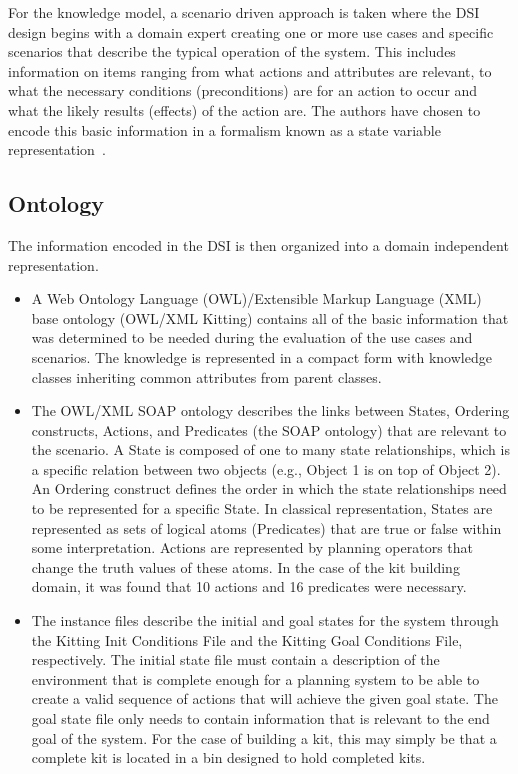 For the knowledge model, a scenario driven approach is taken where the DSI design begins with a domain expert creating one or more use cases and specific scenarios that describe the typical operation of the system. This includes information on items ranging from what actions and attributes are relevant, to what the necessary conditions (preconditions) are for an action to occur and what the likely results (effects) of the action are. The authors have chosen to encode this basic information in a formalism known as a state variable representation~\cite{NAU.2004}.


\subsection{Ontology}
\label{subsection:ontology}
The information encoded in the DSI is then organized into a domain
independent representation.

\begin{itemize}
\item A Web Ontology Language (OWL)/Extensible Markup Language (XML) base ontology (\textsf{OWL/XML Kitting})
contains all of the basic information that was determined to be needed
during the evaluation of the use cases and scenarios. The knowledge is
represented in a compact form with knowledge classes
inheriting common attributes from parent classes.
\item The \textsf{OWL/XML SOAP} ontology describes the links between States, Ordering constructs, Actions, and Predicates (the SOAP
ontology) that are relevant to the scenario. A State is composed of one to many state relationships, which is
a specific relation between two objects (e.g., Object 1 is on top of Object 2). An Ordering construct defines the order in which the state relationships need to be
represented for a specific State. In classical representation, States are represented as sets of logical
atoms (Predicates) that are true or false within some interpretation. Actions are represented by
planning operators that change the truth values of these atoms. In the case of the kit building domain, it was found that 10 actions and
16 predicates were necessary.

\item The instance files describe the initial and goal states for the
system through the \textsf{Kitting Init Conditions File} and the
\textsf{Kitting Goal Conditions File}, respectively. The initial state file
must contain a description of the environment that is complete enough for a
planning system to be able to create a valid sequence of actions that will
achieve the given goal state. The goal state file only needs to contain
information that is relevant to the end goal of the system. For the case of building a kit, this may simply be that a complete kit is located in a bin designed to hold completed kits.

\end{itemize}




